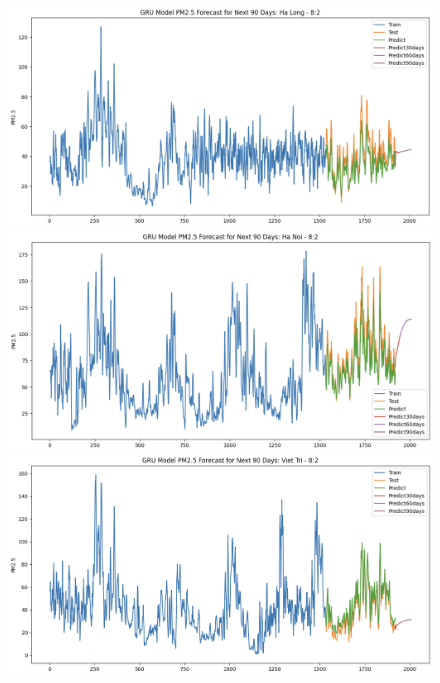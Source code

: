 \begin{figure}[H]
    \begin{minipage}{0.15\textwidth}
        \centering
        \includegraphics[width=1\textwidth, height=0.6\textwidth]{img/final/GRU/90D/GRU_8_2_HL.png}
        \end{minipage}
        \hfill
        \begin{minipage}{0.15\textwidth}
        \centering
        \includegraphics[width=1\textwidth, height=0.6\textwidth]{img/final/GRU/90D/GRU_8_2_HN.png}
        \end{minipage}
        \hfill
        \begin{minipage}{0.15\textwidth}
        \centering
        \includegraphics[width=1\textwidth, height=0.6\textwidth]{img/final/GRU/90D/GRU_8_2_VT.png}
        \end{minipage}
        \hfill


\end{figure}
